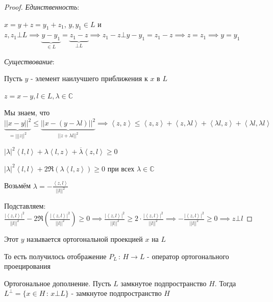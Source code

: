 \begin{proof}
    \textit{Единственность}:

    $x = y + z = y_1 + z_1$, $y, y_1 \in L$ и $z, z_1 \bot L \implies \underbrace{y - y_1}_{\in L} = \underbrace{z_1 - z}_{\bot L} \implies z_1 - z \bot y - y_1 = z_1 - z \implies z = z_1 \implies y = y_1$

    \textit{Существование}:

    Пусть $y$ - элемент наилучшего приближения к $x$ в $L$

    $z = x - y, l \in L, \lambda \in \mathbb{C}$

    Мы знаем, что $\underbrace{|| x - y ||^2}_{= |||z||^2} \leqslant \underbrace{|| x - (y - \lambda l) ||^2}_{||z + \lambda l||^2} \implies \left < z, z \right > \leqslant \left < z, z \right > + \left < z, \lambda l \right > + \left < \lambda l, z \right > + \left < \lambda l, \lambda l \right >$

    $|\lambda|^2 \left < l, l \right > + \lambda \left < l, z \right > + \overline{\lambda} \left < z, l \right > \geqslant 0$

    $|\lambda|^2 \left < l, l \right > + 2 \Re (\lambda \left < l, z \right >) \geqslant 0$ при всех $\lambda \in \mathbb{C}$

    Возьмём $\lambda = -\frac{\left < z, l \right >}{||l||^2}$

    Подставляем: $\frac{|\left < z, l \right >|^2}{||l||^2} - 2\Re \left( \frac{|\left < z, l \right >|^2}{||l||^2} \right) \geq 0 \implies \frac{|\left < z, l \right >|^2}{||l||^2} \geq 2 \cdot \frac{|\left < z, l \right >|^2}{||l||^2} \implies - \frac{|\left <z, l \right >|^2}{||l||^2} \geq 0 \implies z \bot l$
\end{proof}

\begin{definition}
    Этот $y$ называется ортогональной проекцией $x$ на $L$
    
    То есть получилось отображение $P_L \, : \, H \to L$ - оператор ортогонального проецирования
\end{definition}

\begin{definition}
    Ортогональное дополнение. Пусть $L$ замкнутое подпространство $H$. Тогда $L^\bot = \{ x \in H \, : \, x \bot L \}$ - замкнутое подпространство $H$
\end{definition}

